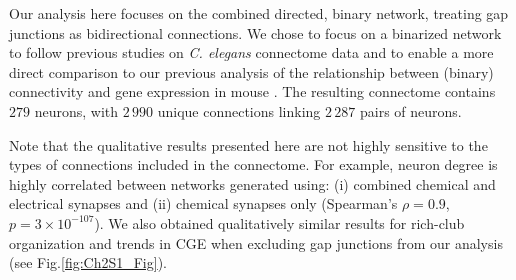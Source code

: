 Our analysis here focuses on the combined directed, binary network, treating gap junctions as bidirectional connections.
We chose to focus on a binarized network to follow previous studies on \textit{C. elegans} connectome data \citep{Kaufman2006, Towlson2013, Varier2011, Varadan2006, Pavlovic2014} and to enable a more direct comparison to our previous analysis of the relationship between (binary) connectivity and gene expression in mouse \citep{Fulcher2016}.
The resulting connectome contains $279$ neurons, with $2\,990$ unique connections linking $2\,287$ pairs of neurons.

Note that the qualitative results presented here are not highly sensitive to the types of connections included in the connectome.
For example, neuron degree is highly correlated between networks generated using: (i) combined chemical and electrical synapses and (ii) chemical synapses only (Spearman's $\rho= 0.9$, $p = 3 \times 10^{-107}$).
We also obtained qualitatively similar results for rich-club organization and trends in CGE when excluding gap junctions from our analysis (see Fig.\ref{fig:Ch2S1_Fig}).

